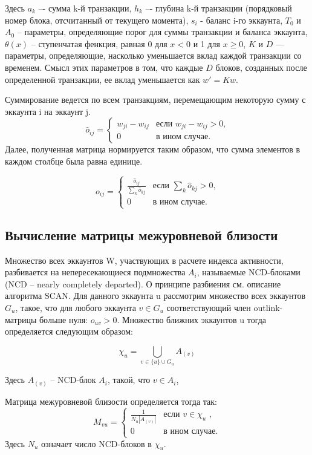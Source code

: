 \documentclass[a4paper,12pt]{article}
\begin{document}
Здесь $a_k$ –- сумма k-й транзакции, $h_k$ –- глубина  k-й транзакции (порядковый номер блока, отсчитанный от текущего момента), $s_i$ - баланс i-го эккаунта, $T_0$ и $A_0$ -- параметры, определяющие порог для суммы транзакции и баланса эккаунта, $\theta(x)$ -- ступенчатая фенкция, равная 0 для $x<0$ и 1 для $x \ge 0$, $K$ и  $D$ — параметры, определяющие, насколько уменьшается вклад каждой транзакции со временем. Смысл этих параметров в том, что каждые $D$ блоков, созданных после определенной транзакции, ее вклад уменьшается как $w'=Kw$.

Суммирование ведется по всем транзакциям, перемещающим некоторую сумму с эккаунта i на эккаунт j.
$$
\hat{o}_{ij} = \begin{cases}
 w_{ji}-w_{ij}
 & \text{если $w_{ji}-w_{ij} > 0$,}\\
 0 & \text{в ином случае.}
\end{cases}
$$
Далее, полученная матрица нормируется таким образом, что сумма элементов в каждом столбце была равна единице. 

$$
o_{ij} = \begin{cases}
 \frac{\hat{o}_{ij}} {\sum\limits_{k} \hat{o}_{kj}}
 & \text{если $\sum\limits_{k} \hat{o}_{kj}> 0$,}\\
 0 & \text{в ином случае.}
\end{cases} 
$$

\subsection{Вычисление матрицы межуровневой близости}

Множество всех эккаунтов W, участвующих в расчете индекса активности, разбивается на непересекающиеся подмножества $A_i$, называемые NCD-блоками (NCD – nearly completely departed). О принципе разбиения см. описание алгоритма SCAN. 
Для данного эккаунта u рассмотрим множество всех эккаунтов $G_u$, такое, что для любого эккаунта $v \in G_u$ соответствующий член outlink-матрицы больше нуля: $o_{uv} > 0$. Множество ближних эккаунтов u тогда определяется следующим образом:

$$
\chi_u = \bigcup_{v \in \{u\} \cup G_u} A_{(v)}
$$

Здесь $A_{(v)}$ -- NCD-блок $A_i$, такой, что $v \in A_i$, 

Матрица межуровневой близости определяется тогда так:
$$
M_{vu}=\begin{cases}
 \frac{1}{N_u |A_{(v)}|}
 & \text{если $v \in \chi_u$ ,}\\
 0 & \text{в ином случае.}
\end{cases}
$$
Здесь $N_u$ означает число NCD-блоков в $\chi_u$.
\end{document}
